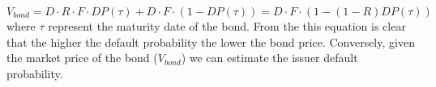 \begin{equation}
V_{bond} = D \cdot R \cdot F \cdot DP ( \tau ) + D \cdot F \cdot ( 1 − DP ( \tau)) = D\cdot F \cdot ( 1 − ( 1 − R ) DP ( \tau ))
\end{equation}
\noindent
where $\tau$ represent the maturity date of the bond.
From the this equation is clear that the higher the default probability the lower the bond price. Conversely, given the market price of the bond ($V_{bond}$) we can estimate the issuer default probability.

%


